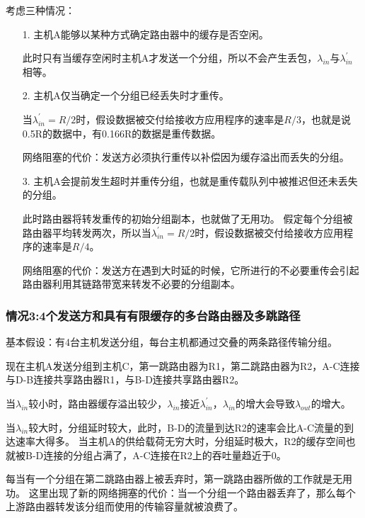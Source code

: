 \documentclass[a4paper,left=2.5cm,right=2.5cm,11pt]{article}
\begin{document}
	考虑三种情况：
	\begin{itemize}
		\item[1.] 主机A能够以某种方式确定路由器中的缓存是否空闲。\par
				  此时只有当缓存空闲时主机A才发送一个分组，所以不会产生丢包，$\lambda_{in}$与$\lambda^'_{in}$相等。

		\item[2.] 主机A仅当确定一个分组已经丢失时才重传。\par
				  当$\lambda^'_{in}=R/2$时，假设数据被交付给接收方应用程序的速率是$R/3$，也就是说0.5R的数据中，有0.166R的数据是重传数据。\par

				  网络阻塞的代价：发送方必须执行重传以补偿因为缓存溢出而丢失的分组。

		\item[3.] 主机A会提前发生超时并重传分组，也就是重传载队列中被推迟但还未丢失的分组。\par
		          此时路由器将转发重传的初始分组副本，也就做了无用功。
				  假定每个分组被路由器平均转发两次，所以当$\lambda^'_{in}=R/2$时，假设数据被交付给接收方应用程序的速率是$R/4$。\par

				  网络阻塞的代价：发送方在遇到大时延的时候，它所进行的不必要重传会引起路由器利用其链路带宽来转发不必要的分组副本。
	\end{itemize}

\subsubsection{情况3:4个发送方和具有有限缓存的多台路由器及多跳路径}
	基本假设：有4台主机发送分组，每台主机都通过交叠的两条路径传输分组。\par

	现在主机A发送分组到主机C，第一跳路由器为R1，第二跳路由器为R2，A-C连接与D-B连接共享路由器R1，与B-D连接共享路由器R2。\par

	当$\lambda_{in}$较小时，路由器缓存溢出较少，$\lambda_{in}$接近$\lambda^'_{in}$，$\lambda_{in}$的增大会导致$\lambda_{out}$的增大。\par

	当$\lambda_{in}$较大时，分组延时较大，此时，B-D的流量到达R2的速率会比A-C流量的到达速率大得多。
	当主机A的供给载荷无穷大时，分组延时极大，R2的缓存空间也就被B-D连接的分组占满了，A-C连接在R2上的吞吐量趋近于0。\par

	每当有一个分组在第二跳路由器上被丢弃时，第一跳路由器所做的工作就是无用功。
	这里出现了新的网络拥塞的代价：当一个分组一个路由器丢弃了，那么每个上游路由器转发该分组而使用的传输容量就被浪费了。
\end{document}
